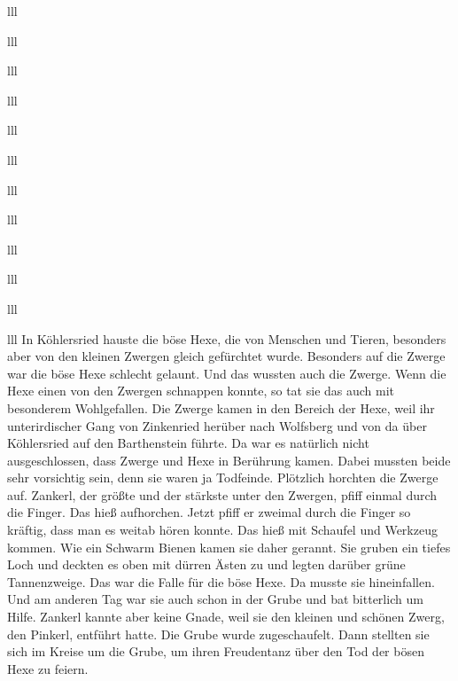 \documentclass[12pt,a4pager]{book}
\begin{document}
\begin{tabuluar}{lll}
\begin{tabuluar}{lll}
\begin{tabuluar}{lll}
\begin{tabuluar}{lll}
\begin{tabuluar}{lll}
\begin{tabuluar}{lll}
\begin{tabuluar}{lll}
\begin{tabuluar}{lll}
\begin{tabuluar}{lll}
\begin{tabuluar}{lll}
\begin{tabuluar}{lll}
\begin{tabuluar}{lll}
In Köhlersried hauste die böse Hexe, die von Menschen und Tieren, besonders aber
von den kleinen Zwergen gleich gefürchtet wurde. Besonders auf die Zwerge war
die böse Hexe schlecht gelaunt. Und das wussten auch die Zwerge. Wenn die Hexe
einen von den Zwergen schnappen konnte, so tat sie das auch mit besonderem
Wohlgefallen. Die Zwerge kamen in den Bereich der Hexe, weil ihr unterirdischer
Gang von Zinkenried herüber nach Wolfsberg und von da über Köhlersried auf den
Barthenstein führte. Da war es natürlich nicht ausgeschlossen, dass Zwerge und
Hexe in Berührung kamen. Dabei mussten beide sehr vorsichtig sein, denn sie
waren ja Todfeinde. Plötzlich horchten die Zwerge auf. Zankerl, der größte und
der stärkste unter den Zwergen, pfiff einmal durch die Finger. Das hieß
aufhorchen. Jetzt pfiff er zweimal durch die Finger so kräftig, dass man es
weitab hören konnte. Das hieß mit Schaufel und Werkzeug kommen. Wie ein Schwarm
Bienen kamen sie daher gerannt. Sie gruben ein tiefes Loch und deckten es oben
mit dürren Ästen zu und legten darüber grüne Tannenzweige. Das war die Falle für
die böse Hexe. Da musste sie hineinfallen. Und am anderen Tag war sie auch schon
in der Grube und bat bitterlich um Hilfe. Zankerl kannte aber keine Gnade, weil
sie den kleinen und schönen Zwerg, den Pinkerl, entführt hatte. Die Grube wurde
zugeschaufelt. Dann stellten sie sich im Kreise um die Grube, um ihren
Freudentanz über den Tod der bösen Hexe zu feiern.


\end{tabuluar}
\end{tabuluar}
\end{tabuluar}
\end{tabuluar}
\end{tabuluar}
\end{tabuluar}
\end{tabuluar}
\end{tabuluar}
\end{tabuluar}
\end{tabuluar}
\end{tabuluar}
\end{tabuluar}
\end{document}
